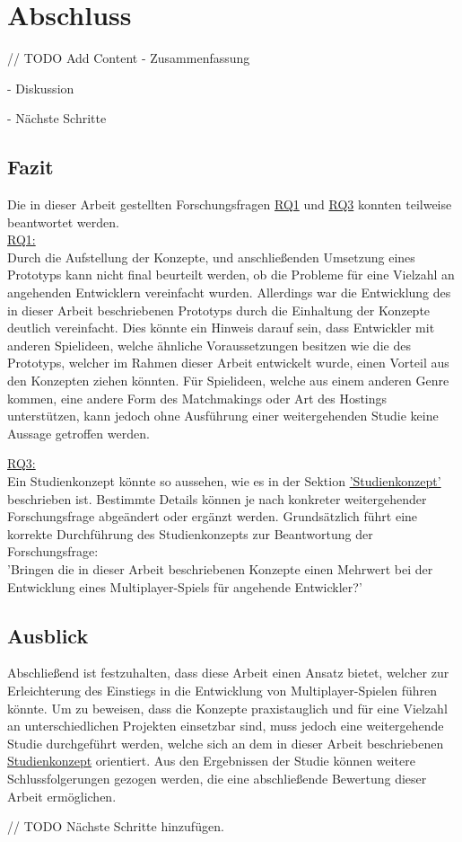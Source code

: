 \chapter{Abschluss}
\label{sec:abschluss}

// TODO Add Content
- Zusammenfassung

- Diskussion

- Nächste Schritte

\section{Fazit}

Die in dieser Arbeit gestellten Forschungsfragen \hyperref[RQ1]{RQ1} und \hyperref[RQ3]{RQ3} konnten teilweise beantwortet werden. \\
\hyperref[RQ1]{RQ1:} \\
Durch die Aufstellung der Konzepte, und anschließenden Umsetzung eines Prototyps kann nicht final beurteilt werden, ob die Probleme für eine Vielzahl an angehenden Entwicklern vereinfacht wurden. Allerdings war die Entwicklung des in dieser Arbeit beschriebenen Prototyps durch die Einhaltung der Konzepte deutlich vereinfacht. Dies könnte ein Hinweis darauf sein, dass Entwickler mit anderen Spielideen, welche ähnliche Voraussetzungen besitzen wie die des Prototyps, welcher im Rahmen dieser Arbeit entwickelt wurde, einen Vorteil aus den Konzepten ziehen könnten. Für Spielideen, welche aus einem anderen Genre kommen, eine andere Form des Matchmakings oder Art des Hostings unterstützen, kann jedoch ohne Ausführung einer weitergehenden Studie keine Aussage getroffen werden.

\hyperref[RQ3]{RQ3:} \\
Ein Studienkonzept könnte so aussehen, wie es in der Sektion \hyperref[studienkonzept]{'Studienkonzept'} beschrieben ist. Bestimmte Details können je nach konkreter weitergehender Forschungsfrage abgeändert oder ergänzt werden. Grundsätzlich führt eine korrekte Durchführung des Studienkonzepts zur Beantwortung der Forschungsfrage: \\
'Bringen die in dieser Arbeit beschriebenen Konzepte einen Mehrwert bei der Entwicklung eines Multiplayer-Spiels für angehende Entwickler?'

\section{Ausblick}

Abschließend ist festzuhalten, dass diese Arbeit einen Ansatz bietet, welcher zur Erleichterung des Einstiegs in die Entwicklung von Multiplayer-Spielen führen könnte. Um zu beweisen, dass die Konzepte praxistauglich und für eine Vielzahl an unterschiedlichen Projekten einsetzbar sind, muss jedoch eine weitergehende Studie durchgeführt werden, welche sich an dem in dieser Arbeit beschriebenen \hyperref[studienkonzept]{Studienkonzept} orientiert. Aus den Ergebnissen der Studie können weitere Schlussfolgerungen gezogen werden, die eine abschließende Bewertung dieser Arbeit ermöglichen.

// TODO Nächste Schritte hinzufügen.
